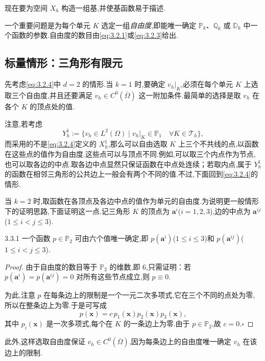 现在要为空间 \(X_h\) 构造一组基,并使基函数易于描述.

一个重要问题是为每个单元 \(K\) 选定一组\emph{自由度},即能唯一确定 \(\mathbb P_k\)、\(\mathbb Q_k\) 或 \(\mathbb D_k\) 中一个函数的参数.自由度的数目由\eqref{eq:3.2.1}或\eqref{eq:3.2.3}给出.

\subsection{标量情形：三角形有限元}\label{sec:3.3.1}

先考虑\eqref{eq:3.2.4}中 \(d=2\) 的情形.当 \(k=1\) 时,要确定 \(v_h|_K\),必须在每个单元 \(K\) 上选取三个自由度,并且还要满足 \(v_h\in C^0(\overline\Omega)\) 这一附加条件.最简单的选择是取 \(v_h\) 在各个 \(K\) 的顶点处的值.

注意,若考虑
\[
  Y_h^1:=\{v_h\in L^2(\Omega)\mid v_h|_K\in\mathbb P_1\quad\forall K\in\mathcal T_h\},
\]
而采用的不是\eqref{eq:3.2.4}定义的 \(X_h^1\),那么可以自由选取 \(K\) 上三个不共线的点,以函数在这些点的值作为自由度.这些点可以与顶点不同.例如,可以取三个内点作为节点,也可以取各边的中点.取各边中点显然只保证函数在中点处连续；若取内点,属于 \(Y_h^1\) 的函数在相邻三角形的公共边上一般会有两个不同的值.不过,下面回到\eqref{eq:3.2.4}的情形.

当 \(k=2\) 时,取函数在各顶点及各边中点的值作为单元的自由度.为说明更一般情形下的证明思路,下面证明这一点.记三角形 \(K\) 的顶点为 \(\boldsymbol{a}^i\)(\(i=1,2,3\)),边的中点为 \(\boldsymbol{a}^{ij}\)(\(1\le i<j\le3\)).

\begin{proposition}[]{3.3.1}
一个函数 \(p\in\mathbb P_2\) 可由六个值唯一确定,即 \(p(\boldsymbol{a}^i)\)(\(1\le i\le3\))和 \(p(\boldsymbol{a}^{ij})\)(\(1\le i<j\le3\)).
\end{proposition}

\begin{proof}
由于自由度的数目等于 \(\mathbb P_2\) 的维数,即 \(6\),只需证明：若 \(p(\boldsymbol{a}^i)=p(\boldsymbol{a}^{ij})=0\) 对所有这些节点成立,则 \(p\equiv0\).

为此,注意 \(p\) 在每条边上的限制是一个一元二次多项式,它在三个不同的点处为零,所以在整条边上为零.于是可写成
\[
  p(\boldsymbol{x})=c\,p_1(\boldsymbol{x})p_2(\boldsymbol{x})p_3(\boldsymbol{x}),
\]
其中 \(p_i(\boldsymbol{x})\) 是一次多项式,每个在 \(K\) 的一条边上为零.由于 \(p\in\mathbb P_2\),故 \(c=0\).\hfill\(\square\)
\end{proof}

此外,这样选取自由度保证 \(v_h\in C^0(\overline\Omega)\),因为每条边上的自由度唯一确定 \(v_h\) 在该边上的限制.

